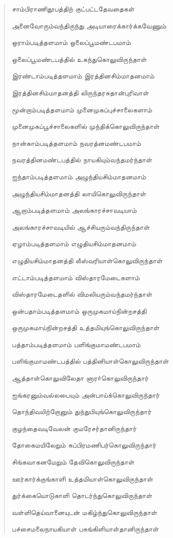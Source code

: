 \documentclass{article}
\begin{document}
\begin{quotation}
{சாம்பிராணிதூபத்திற் குட்பட்டதேவதைகள்

அனைவோரும்வந்திருந்து அடியாரைக்கார்க்கவேணும்

ஒராம்படித்தளமாம் ஒலைப்பூமண்டபமாம்

ஒலைப்பூமண்டபத்தில் உகந்துகொலுவிருந்தாள்

இரண்டாம்படித்தளமாம் இரத்தினசிம்மாதனமாம்

இரத்தினசிம்மாதனத்தி லிருந்தரசுதான்புரிவாள்

மூன்றாம்படித்தளமாம் முனைமுகப்புச்சாலைகளாம்

முனைமுகப்பூச்சாலைகளில் முந்திக்கொலுவிருந்தாள்

நான்காம்படித்தளமாம் நவரத்னமண்டபமாம்

நவரத்தினமண்டபத்தில் நாயகியும்வந்தமர்ந்தாள்

ஐந்தாம்படித்தளமாம் அழுந்தியசிம்மாதனமாம்

அழுந்தியசிம்மாதனத்தி லாயிகொலுவிருந்தாள்

ஆறாம்படித்தளமாம் அலங்காரச்சாவடியாம்

அலங்காரச்சாவடியில் ஆச்சியரும்வந்திருந்தாள்

ஏழாம்படித்தளமாம் எழுதியசிம்மாதனமாம்

எழுதியசிம்மாதனத்தி லீஸ்வரியாள்கொலுவிருந்தாள்

எட்டாம்படித்தளமாம் விஸ்தாரமேடைகளாம்

விஸ்தாரமேடைதளில் விமலியரும்வந்தமர்ந்தாள்

ஒன்பதாம்படித்தளமாம் ஒருமுகமாய்நின்றசத்தி

ஒருமுகமாய்நின்றசத்தி உத்தமியுங்கொலுவிருந்தாள்

பத்தாம்படித்தளமாம் பளிங்குமாமண்டபமாம்

பளிங்குமாமண்டபத்தில் பத்தினியாள்கொலுவிருந்தாள்

ஆத்தாள்கொலுவிலேதா னாரா்கொலுவிருந்தார்

ஐங்கரனும்வல்லபையும் அன்பாய்க்கொலுவிருந்தார்

தொந்திவயிற்றோனும் துந்துபியுங்கொலுவிருந்தார்

குழந்தைவடிவேலன் குமரேசர்தானிருந்தார்

தோகைமயிலேறும் சுப்பிரமணிபர்கொலுவிருந்தார்

சிங்கவாகனமேறும் தேவிகொலுவிருந்தாள்

ஊர்கார்க்குங்காளி உத்தமியாள்கொலுவிருந்தாள்

துர்க்கையொடுகாளி தொடர்ந்துகொலுவிருந்தாள்

வள்ளிதெய்வானையுடன் மகிழ்ந்துகொலுவிருந்தாள்

பச்சைமலைநாயகியாள் பசுங்கிளியாள்தானிருந்தாள்

}
\end{quotation}
\end{document}
